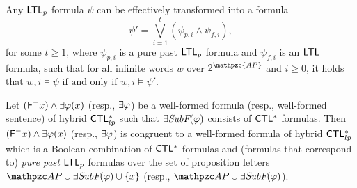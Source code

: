 \begin{theorem}\label{th:LTLpsep}
Any $\text{\sffamily LTL$_p$}$ formula $\psi$ can be effectively transformed into a formula
\[
\psi'=   \bigvee_{i=1}^t(\psi_{p,i}\wedge \psi_{f,i}),
\]
for some $t\geq 1$, where $\psi_{p,i}$ is a pure past $\text{\sffamily LTL$_p$}$ formula and $\psi_{f,i}$ is an $\text{\sffamily LTL}$ formula, such that
for all infinite words $w$ over $2^{\mathpzc{AP}}$ and $i\geq 0$, it holds that
$
 w,i\models \psi \text{ if and only if } w,i\models \psi'.
$
\end{theorem}

\begin{lemma}\label{lemma:UsingSeparationHybridCTL} Let $(\textsf{F}^{-} x)\wedge \exists \varphi(x)$ (resp., $\exists\varphi$) be a well-formed formula (resp., well-formed sentence) of hybrid $\text{\sffamily CTL$^{*}_{lp}$}$ such that $\exists\textit{SubF}(\varphi)$ consists of
$\text{\sffamily CTL$^{*}$}$ formulas. Then $(\textsf{F}^{-} x)\wedge \exists \varphi(x)$ (resp., $\exists\varphi$) is congruent to a well-formed formula of hybrid $\text{\sffamily CTL$^{*}_{lp}$}$ which is a Boolean combination of $\text{\sffamily CTL$^{*}$}$ formulas and (formulas that
correspond to) \emph{pure past}  $\text{\sffamily LTL$_p$}$ formulas over the set of proposition letters $\Prop\cup  \EQSubf(\varphi) \cup \{x\}$ (resp., $\Prop\cup  \EQSubf(\varphi)$).
\end{lemma}
